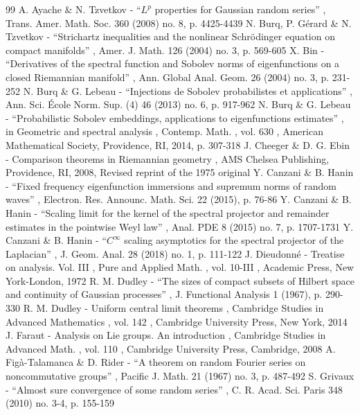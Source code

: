 \documentclass[11pt]{article}
\theoremstyle{theorem}
\theoremstyle{definition}
\begin{document}
\begin{thebibliography}{99}
 A. Ayache \& N. Tzvetkov - “$L^p$ properties for Gaussian random series” , Trans. Amer. Math. Soc. 360 (2008) no. 8, p. 4425-4439
 N. Burq, P. Gérard \& N. Tzvetkov - “Strichartz inequalities and the nonlinear Schrödinger equation on compact manifolds” , Amer. J. Math. 126 (2004) no. 3, p. 569-605
 X. Bin - “Derivatives of the spectral function and Sobolev norms of eigenfunctions on a closed Riemannian manifold” , Ann. Global Anal. Geom. 26 (2004) no. 3, p. 231-252
 N. Burq \& G. Lebeau - “Injections de Sobolev probabilistes et applications” , Ann. Sci. École Norm. Sup. (4) 46 (2013) no. 6, p. 917-962
 N. Burq \& G. Lebeau - “Probabilistic Sobolev embeddings, applications to eigenfunctions estimates” , in Geometric and spectral analysis , Contemp. Math. , vol. 630 , American Mathematical Society, Providence, RI, 2014, p. 307-318
 J. Cheeger \& D. G. Ebin - Comparison theorems in Riemannian geometry , AMS Chelsea Publishing, Providence, RI, 2008, Revised reprint of the 1975 original
 Y. Canzani \& B. Hanin - “Fixed frequency eigenfunction immersions and supremum norms of random waves” , Electron. Res. Announc. Math. Sci. 22 (2015), p. 76-86
 Y. Canzani \& B. Hanin - “Scaling limit for the kernel of the spectral projector and remainder estimates in the pointwise Weyl law” , Anal. PDE 8 (2015) no. 7, p. 1707-1731
 Y. Canzani \& B. Hanin - “$C^\infty $ scaling asymptotics for the spectral projector of the Laplacian” , J. Geom. Anal. 28 (2018) no. 1, p. 111-122
 J. Dieudonné - Treatise on analysis. Vol. III , Pure and Applied Math. , vol. 10-III , Academic Press, New York-London, 1972
 R. M. Dudley - “The sizes of compact subsets of Hilbert space and continuity of Gaussian processes” , J. Functional Analysis 1 (1967), p. 290-330
 R. M. Dudley - Uniform central limit theorems , Cambridge Studies in Advanced Mathematics , vol. 142 , Cambridge University Press, New York, 2014
 J. Faraut - Analysis on Lie groups. An introduction , Cambridge Studies in Advanced Math. , vol. 110 , Cambridge University Press, Cambridge, 2008
 A. Figà-Talamanca \& D. Rider - “A theorem on random Fourier series on noncommutative groups” , Pacific J. Math. 21 (1967) no. 3, p. 487-492
 S. Grivaux - “Almost sure convergence of some random series” , C. R. Acad. Sci. Paris 348 (2010) no. 3-4, p. 155-159

\end{thebibliography}
\end{document}
